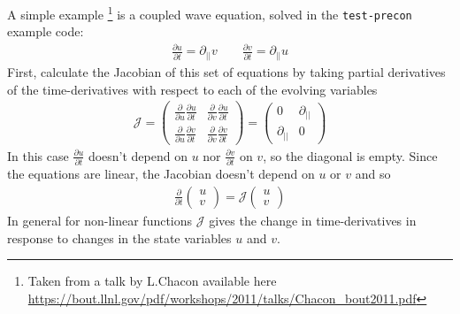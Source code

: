 \documentclass[12pt]{article}
\def\L{\left}
\def\R{\right}
\begin{document}
A simple example
%
\footnote{Taken from a talk by L.Chacon available here
\url{https://bout.llnl.gov/pdf/workshops/2011/talks/Chacon_bout2011.pdf}} is a
coupled wave equation, solved in the \texttt{test-precon} example code:
%
\begin{align}
\frac{\partial u}{\partial t} = \partial_{||}v \qquad \frac{\partial
v}{\partial t} = \partial_{||} u
\end{align}
%
First, calculate the Jacobian of this set of equations by taking partial
derivatives of the time-derivatives with respect to each of the evolving
variables
%
\begin{align}
\mathcal{J} = \L(%
\begin{array}{cc}
\frac{\partial}{\partial u}\frac{\partial u}{\partial t} &
\frac{\partial}{\partial v}\frac{\partial u}{\partial t}\\
\frac{\partial}{\partial u}\frac{\partial v}{\partial t} &
\frac{\partial}{\partial v}\frac{\partial v}{\partial t}
\end{array}
%
\R) = \L(%
\begin{array}{cc}
0 & \partial_{||} \\
\partial_{||} & 0
\end{array}
%
\R)
\end{align}
%
In this case $\frac{\partial u}{\partial t}$ doesn't depend on $u$ nor
$\frac{\partial v}{\partial t}$ on $v$, so the diagonal is empty. Since the
equations are linear, the Jacobian doesn't depend on $u$ or $v$ and so
%
\begin{align}
\frac{\partial}{\partial t}\L(%
\begin{array}{c}
u \\
v
\end{array}\R) = \mathcal{J}
%
 \L(%
\begin{array}{c}
u \\
v
\end{array}
%
\R)
\end{align}
%
In general for non-linear functions $\mathcal{J}$ gives the change in
time-derivatives in response to changes in the state variables $u$ and $v$.
\end{document}
